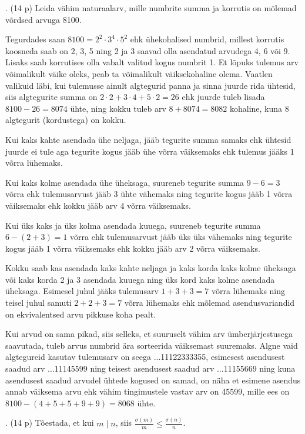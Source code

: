 \documentclass[a4paper, 10pt]{article}
\begin{document}
\pagebreak

. (14 p) Leida vähim naturaalarv, mille numbrite summa ja korrutis on mõlemad võrdsed arvuga 8100.

\bigskip
Tegurdades saan $8100=2^2\cdot3^4\cdot5^2$ ehk ühekohalised numbrid, millest korrutis koosneda saab on 2, 3, 5 ning 2 ja 3 saavad olla asendatud arvudega 4, 6 või 9. Lisaks saab korrutises olla vabalt valitud kogus numbrit 1. Et lõpuks tulemus arv võimalikult väike oleks, peab ta võimalikult väiksekohaline olema. Vaatlen valikuid läbi, kui tulemusse ainult algtegurid panna ja sinna juurde rida ühtesid, siis algtegurite summa on $2\cdot2+3\cdot4+5\cdot2=26$ ehk juurde tuleb lisada $8100-26=8074$ ühte, ning kokku tuleb arv $8+8074=8082$ kohaline, kuna 8 algtegurit (kordustega) on kokku.

Kui kaks kahte asendada ühe neljaga, jääb tegurite summa samaks ehk ühtesid juurde ei tule aga tegurite kogus jääb ühe võrra väiksemaks ehk tulemus jääks 1 võrra lühemaks.

Kui kaks kolme asendada ühe üheksaga, suureneb tegurite summa $9-6=3$ võrra ehk tulemusarvust jääb 3 ühte vähemaks ning tegurite kogus jääb 1 võrra väiksemaks ehk kokku jääb arv 4 võrra väiksemaks.

Kui üks kaks ja üks kolma asendada kuuega, suureneb tegurite summa $6-(2+3)=1$ võrra ehk tulemusarvust jääb üks üks vähemaks ning tegurite kogus jääb 1 võrra väiksemaks ehk kokku jääb arv 2 võrra väiksemaks.

Kokku saab kas asendada kaks kahte neljaga ja kaks korda kaks kolme üheksaga või kaks korda 2 ja 3 asendada kuuega ning üks kord kaks kolme asendada üheksaga. Esimesel juhul jääks tulemusarv $1+3+3=7$ võrra lühemaks ning teisel juhul samuti $2+2+3=7$ võrra lühemaks ehk mõlemad asendusvariandid on ekvivalentsed arvu pikkuse koha pealt.

Kui arvud on sama pikad, siis selleks, et suuruselt vähim arv ümberjärjestusega saavutada, tuleb arvus numbrid ära sorteerida väiksemast suuremaks. Algne vaid algtegureid kasutav tulemusarv on seega ...11122333355, esimesest asendusest saadud arv ...11145599 ning teisest asendusest saadud arv ...11155669 ning kuna asendusest saadud arvudel ühtede kogused on samad, on näha et esimene asendus annab väiksema arvu ehk vähim tingimustele vastav arv on 45599, mille ees on $8100-(4+5+5+9+9)=8068$ ühte.
\bigskip

\pagebreak

. (14 p) Tõestada, et kui $m\mid n$, siis $\frac{\sigma(m)}{m}\leq \frac{\sigma(n)}{n}$.
\end{document}
